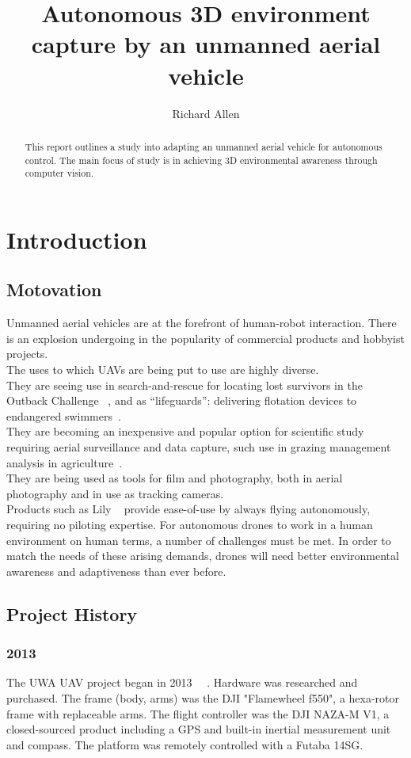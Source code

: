 \documentclass[a4paper, 12pt, titlepage]{article}
\title{Autonomous 3D environment capture by an unmanned aerial vehicle}
\author{Richard Allen}
\begin{document}


\begin{abstract}
This report outlines a study into adapting an unmanned aerial vehicle for autonomous control. The main focus of study is in achieving 3D environmental awareness through computer vision. 
\end{abstract}

\tableofcontents
\newpage

\section{Introduction}
	\subsection{Motovation}
Unmanned aerial vehicles are at the forefront of human-robot interaction. There is an explosion undergoing in the popularity of commercial products and hobbyist projects.
\\The uses to which UAVs are being put to use are highly diverse. 
\\They are seeing use in search-and-rescue for locating lost survivors in the Outback Challenge ~\cite{canberrauav-2012}, and as ``lifeguards'': delivering flotation devices to endangered swimmers~\cite{Motherboard}.
\\They are becoming an inexpensive and popular option for scientific study requiring aerial surveillance and data capture, such use in grazing management analysis in agriculture~\cite{UWAnews}.
\\They are being used as tools for film and photography, both in aerial photography and in use as tracking cameras. 
\\Products such as Lily ~\cite{Lily} provide ease-of-use by always flying autonomously, requiring no piloting expertise. For autonomous drones to work in a human environment on human terms, a number of challenges must be met. In order to match the needs of these arising demands, drones will need better environmental awareness and adaptiveness than ever before.


	\subsection{Project History}
		\subsubsection{2013}
The UWA UAV project began in 2013 ~\cite{Venables}~\cite{OConnor}. Hardware was researched and purchased. The frame (body, arms) was the DJI "Flamewheel f550", a hexa-rotor frame with replaceable arms. The flight controller was the DJI NAZA-M V1, a closed-sourced product including a GPS and built-in inertial measurement unit and compass. The platform was remotely controlled with a Futaba 14SG.
\end{document}
